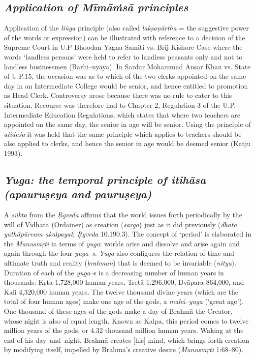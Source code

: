 \subsection*{\textit{Application of Mīmāṁsā principles}}

Application of the \textit{liṅga} principle (also called \textit{lakṣaṇārtha} = the suggestive power of the words or expression) can be illustrated with reference to a decision of the Supreme Court in U.P Bhoodan Yagna Samiti vs. Brij Kishore Case where the words ‘landless persons’ were held to refer to landless peasants only and not to landless businessmen (Barhi–nyāya). In Sardar Mohammad Ansar Khan vs. State of U.P.15, the occasion was as to which of the two clerks appointed on the same day in an Intermediate College would be senior, and hence entitled to promotion as Head Clerk. Controversy arose because there was no rule to cater to this situation. Recourse was therefore had to Chapter 2, Regulation 3 of the U.P. Intermediate Education Regulations, which states that where two teachers are appointed on the same day, the senior in age will be senior. Using the principle of \textit{atideśa} it was held that the same principle which applies to teachers should be also applied to clerks, and hence the senior in age would be deemed senior (Katju 1993).


\subsection*{\textit{Yuga: the temporal principle of itihāsa (apauruṣeya and pauruṣeya)}}

A \textit{sūkta} from the \textit{Ṛgveda} affirms that the world issues forth periodically by the will of Vidhātā (Ordainer) as creation (\textit{sarga}) just as it did previously (\textit{dhātā yathāpūrvam akalpayat}; \textit{Ṛgveda} 10.190.3). The concept of ‘period’ is elaborated in the \textit{Manusmṛti} in terms of \textit{yuga}: worlds arise and dissolve and arise again and again through the four \textit{yuga–s.} \textit{Yuga} also configures the relation of time and ultimate truth and reality (\textit{brahman}) that is deemed to be invariable (\textit{nitya}). Duration of each of the \textit{yuga–}s is a decreasing number of human years in thousands: Kṛta 1,728,000 human years, Tretā 1,296,000, Dvāpara 864,000, and Kali 4,320,000 human years. The twelve thousand divine years (which are the total of four human ages) make one age of the gods, a \textit{mahā–yuga} (‘great age’). One thousand of these ages of the gods make a day of Brahmā the Creator, whose night is also of equal length. Known as Kalpa, this period comes to twelve million years of the gods, or 4.32 thousand million human years. Waking at the end of his day–and–night, Brahmā creates [his] mind, which brings forth creation by modifying itself, impelled by Brahma’s creative desire (\textit{Manusmṛti} 1:68–80).

